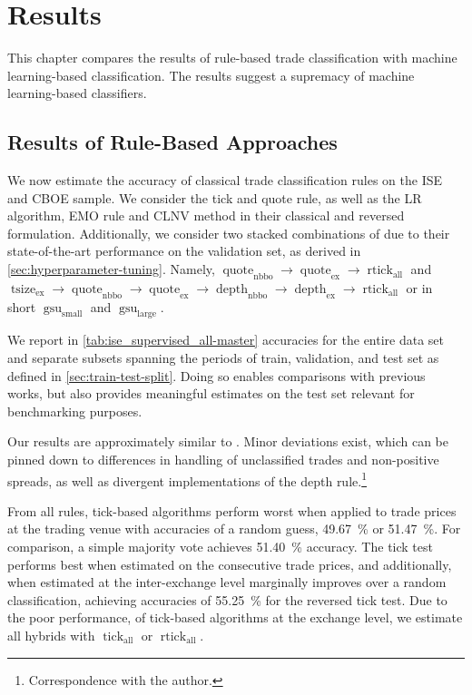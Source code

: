 \section{Results}\label{sec:results}

This chapter compares the results of rule-based trade classification with machine learning-based classification. The results suggest a supremacy of machine learning-based classifiers.

\subsection{Results of Rule-Based Approaches}\label{sec:result-of-rule-based-approaches}

We now estimate the accuracy of classical trade classification rules on the \gls{ISE} and \gls{CBOE} sample. We consider the tick and quote rule, as well as the \gls{LR} algorithm, \gls{EMO} rule and \gls{CLNV} method in their classical and reversed formulation. Additionally, we consider two stacked combinations of \textcite[][12--14]{grauerOptionTradeClassification2022} due to their state-of-the-art performance on the validation set, as derived in \cref{sec:hyperparameter-tuning}. Namely, $\operatorname{quote}_{\mathrm{nbbo}} \to \operatorname{quote}_{\mathrm{ex}} \to \operatorname{rtick}_{\mathrm{all}}$ and $\operatorname{tsize}_{\mathrm{ex}} \to \operatorname{quote}_{\mathrm{nbbo}} \to \operatorname{quote}_{\mathrm{ex}} \to \operatorname{depth}_{\mathrm{nbbo}} \to \operatorname{depth}_{\mathrm{ex}} \to \operatorname{rtick}_{\mathrm{all}}$ or in short $\operatorname{gsu}_{\mathrm{small}}$ and $\operatorname{gsu}_{\mathrm{large}}$.

We report in \cref{tab:ise_supervised_all-master} accuracies for the entire data set and separate subsets spanning the periods of train, validation, and test set as defined in \cref{sec:train-test-split}. Doing so enables comparisons with previous works, but also provides meaningful estimates on the test set relevant for benchmarking purposes.

Our results are approximately similar to \textcite[][29--33]{grauerOptionTradeClassification2022}. Minor deviations exist, which can be pinned down to differences in handling of unclassified trades and non-positive spreads, as well as divergent implementations of the depth rule.\footnote{Correspondence with the author.}

From all rules, tick-based algorithms perform worst when applied to trade prices at the trading venue with accuracies of a random guess, \SI{49.67}{\percent} or \SI{51.47}{\percent}. For comparison, a simple majority vote achieves \SI{51.40}{\percent} accuracy. The tick test performs best when estimated on the consecutive trade prices, and additionally, when estimated at the inter-exchange level marginally improves over a random classification, achieving accuracies of \SI{55.25}{\percent} for the reversed tick test. Due to the poor performance, of tick-based algorithms at the exchange level, we estimate all hybrids with $\operatorname{tick}_{\mathrm{all}}$ or $\operatorname{rtick}_{\mathrm{all}}$.

